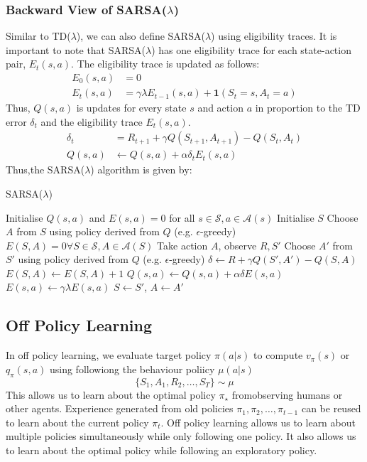 \subsubsection*{Backward View of SARSA(\(\lambda\))}
Similar to TD(\(\lambda\)), we can also define SARSA(\(\lambda\)) using eligibility traces.
It is important to note that SARSA(\(\lambda \)) has one eligibility trace for each
state-action pair, \(E_t(s,a)\). The eligibility trace is updated as follows:
\[
  \begin{aligned}
    E_0(s,a) &= 0 \\
    E_t(s,a) &= \gamma \lambda E_{t-1}(s,a) + \bm{1}(S_t = s, A_t = a)
  \end{aligned}
\]
Thus, \(Q(s,a)\) is updates for every state \(s\) and action \(a\) in proportion to the TD
error \(\delta _t\) and the eligibility trace \(E_t(s,a)\).
\[
  \begin{aligned}
    \delta _t &= R_{t+1} + \gamma Q(S_{t+1}, A_{t+1}) - Q(S_t, A_t) \\
    Q(s,a) &\leftarrow Q(s,a) + \alpha \delta _t E_t(s,a)
  \end{aligned}
\]
Thus,the SARSA(\(\lambda\)) algorithm is given by:
\begin{algorithm}[H]
  \caption{SARSA(\(\lambda\))}
  \label{alg:sarsa-lambda}
  \begin{algorithmic}[1]
    \State Initialise \(Q(s,a)\) and \(E(s,a) = 0\) for all \(s \in \mathcal{S}, a \in
    \mathcal{A}(s)\)
      \State Initialise \(S\)
      \State Choose \(A\) from \(S\) using policy derived from \(Q\) (e.g.
      \(\epsilon\)-greedy)
      \State \(E(S,A) = 0 \forall S \in \mathcal{S}, A \in \mathcal{A}(S)\)
        \State Take action \(A\), observe \(R, S'\)
        \State Choose \(A'\) from \(S'\) using policy derived from \(Q\) (e.g.
        \(\epsilon\)-greedy)
        \State \(\delta \leftarrow R + \gamma Q(S', A') - Q(S,A)\)
        \State \(E(S,A) \leftarrow E(S,A) + 1\)
          \State \(Q(s,a) \leftarrow Q(s,a) + \alpha \delta E(s,a)\)
          \State \(E(s,a) \leftarrow \gamma \lambda E(s,a)\)
        \EndFor
        \State \(S \leftarrow S'\), \(A \leftarrow A'\)
      \EndFor
    \EndFor
  \end{algorithmic}
\end{algorithm}

\subsection{Off Policy Learning}
In off policy learning, we evaluate target policy \(\pi(a|s)\) to compute \(v_\pi(s)\) or \(q_\pi
(s,a)\) using followiong the behaviour poliicy \(\mu(a|s)\)
\[
  \{  S_1, A_1, R_2, \dots, S_T \} \sim \mu
\]
This allows us to learn about the optimal policy \(\pi_\star\) fromobserving humans 
or other agents. Experience generated from old policies \(\pi _1, \pi _2, \dots, \pi _{t-1}\)
can be reused to learn about the current policy \(\pi _t\). Off policy learning allows us to
learn about multiple policies simultaneously while only following one policy. It also allows
us to learn about the optimal policy while following an exploratory policy. 

